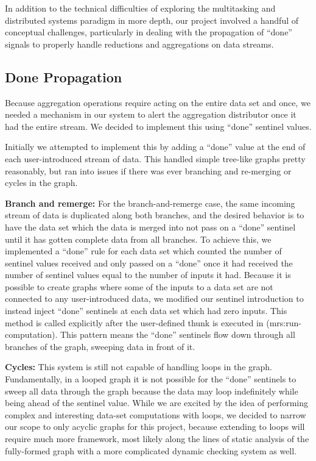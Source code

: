 \documentclass{article}
\begin{document}
In addition to the technical difficulties of exploring the
multitasking and distributed systems paradigm in more depth, our
project involved a handful of conceptual challenges, particularly
in dealing with the propagation of ``done'' signals to properly handle
reductions and aggregations on data streams.

\subsection{Done Propagation}

Because aggregation operations require acting on the entire data set
and once, we needed a mechanism in our system to alert the aggregation
distributor once it had the entire stream. We decided to implement this
using ``done'' sentinel values.

Initially we attempted to implement this by adding a ``done'' value at the
end of each user-introduced stream of data. This handled simple tree-like
graphs pretty reasonably, but ran into issues if there was ever branching and
re-merging or cycles in the graph.

\textbf{Branch and remerge:} For the branch-and-remerge case, the same
incoming stream of data is duplicated along both branches, and the desired
behavior is to have the data set which the data is merged into not pass on
a ``done'' sentinel until it has gotten complete data from all branches.
To achieve this, we implemented a ``done'' rule for each data set which
counted the number of sentinel values received and only passed on a ``done''
once it had received the number of sentinel values equal to the number of
inputs it had. Because it is possible to create graphs where some of the
inputs to a data set are not connected to any user-introduced data, we
modified our sentinel introduction to instead inject ``done'' sentinels
at each data set which had zero inputs. This method is called explicitly
after the user-defined thunk is executed in (mrs:run-computation). This
pattern means the ``done'' sentinels flow down through all branches of
the graph, sweeping data in front of it.

\textbf{Cycles:} This system is still not capable of handling loops in the graph.
Fundamentally,
in a looped graph it is not possible for the ``done'' sentinels to sweep
all data through the graph because the data may loop indefinitely while being
ahead of the sentinel value. While we are excited by the idea of performing
complex and interesting data-set computations with loops, we decided to
narrow our scope to only acyclic graphs for this project, because extending
to loops will require much more framework, most likely along the lines of
static analysis of the fully-formed graph with a more complicated dynamic
checking system as well.
\end{document}
